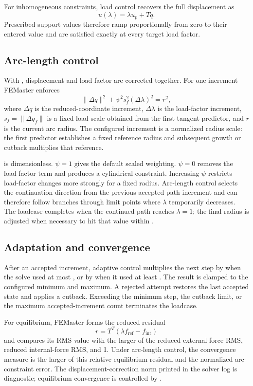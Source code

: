 For inhomogeneous constraints, load control recovers the full displacement as
\[
u(\lambda)=\lambda u_p+Tq.
\]
Prescribed support values therefore ramp proportionally from zero to their entered value and are satisfied exactly at every target load factor.

\subsection{Arc-length control}

With , displacement and load factor are corrected together. For one increment FEMaster enforces
\[
\lVert\Delta q\rVert^2
+ \psi^2 s_f^2(\Delta\lambda)^2
= r^2,
\]
where \(\Delta q\) is the reduced-coordinate increment, \(\Delta\lambda\) is the load-factor increment, \(s_f=\lVert\Delta q_f\rVert\) is a fixed load scale obtained from the first tangent predictor, and \(r\) is the current arc radius. The configured increment is a normalized radius scale: the first predictor establishes a fixed reference radius and subsequent growth or cutback multiplies that reference.

 is dimensionless. \(\psi=1\) gives the default scaled weighting. \(\psi=0\) removes the load-factor term and produces a cylindrical constraint. Increasing \(\psi\) restricts load-factor changes more strongly for a fixed radius. Arc-length control selects the continuation direction from the previous accepted path increment and can therefore follow branches through limit points where \(\lambda\) temporarily decreases. The loadcase completes when the continued path reaches \(\lambda=1\); the final radius is adjusted when necessary to hit that value within .

\subsection{Adaptation and convergence}

After an accepted increment, adaptive control multiplies the next step by  when the solve used at most , or by  when it used at least . The result is clamped to the configured minimum and maximum. A rejected attempt restores the last accepted state and applies a cutback. Exceeding the minimum step, the cutback limit, or the maximum accepted-increment count terminates the loadcase.

For equilibrium, FEMaster forms the reduced residual
\[
r=T^T(\lambda f_\mathrm{ref}-f_\mathrm{int})
\]
and compares its RMS value with the larger of the reduced external-force RMS, reduced internal-force RMS, and 1. Under arc-length control, the convergence measure is the larger of this relative equilibrium residual and the normalized arc-constraint error. The displacement-correction norm printed in the solver log is diagnostic; equilibrium convergence is controlled by .

